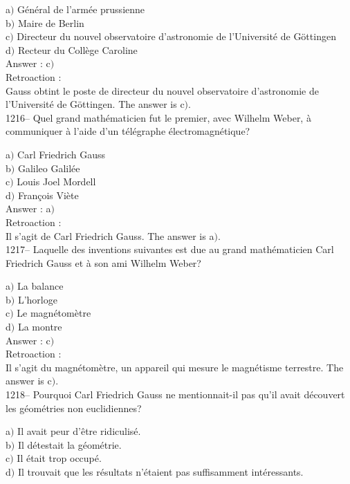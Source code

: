 ﻿\documentclass[letterpaper, 12pt]{article}
\begin{document}
a$)$ G\'en\'eral de l'arm\'ee prussienne \\
b$)$ Maire de Berlin \\
c$)$ Directeur du nouvel observatoire d'astronomie de l'Universit\'e de
G\"ottingen \\
d$)$ Recteur du Coll\`ege Caroline\\

Answer : c$)$\\

Retroaction : \\
Gauss obtint le poste de directeur du nouvel observatoire
d'astronomie de l'Universit\'e de G\"ottingen.
The answer is c$)$.\\

1216-- Quel grand math\'ematicien fut le premier, avec Wilhelm
Weber, \`a communiquer \`a l'aide d'un t\'el\'egraphe
\'electromagn\'etique?

a$)$ Carl Friedrich Gauss \\
b$)$ Galileo Galil\'ee \\
c$)$ Louis Joel Mordell \\
d$)$ Fran\c cois Vi\`ete\\

Answer : a$)$\\

Retroaction : \\
Il s'agit de Carl Friedrich Gauss.
The answer is a$)$.\\

1217-- Laquelle des inventions suivantes est due au grand
math\'ematicien Carl Friedrich Gauss et \`a son ami Wilhelm Weber?

a$)$ La balance \\
b$)$ L'horloge \\
c$)$ Le magn\'etom\`etre \\
d$)$ La montre\\

Answer : c$)$\\

Retroaction : \\
Il s'agit du magn\'etom\`etre, un appareil qui mesure le
magn\'etisme terrestre.
The answer is c$)$.\\

1218-- Pourquoi Carl Friedrich Gauss ne mentionnait-il pas qu'il
avait d\'ecouvert les g\'eom\'etries non euclidiennes?

a$)$ Il avait peur d'\^etre ridiculis\'e. \\
b$)$ Il d\'etestait la g\'eom\'etrie. \\
c$)$ Il \'etait trop occup\'e. \\
d$)$ Il trouvait que les r\'esultats n'\'etaient pas suffisamment
int\'eressants.\\
\end{document}
